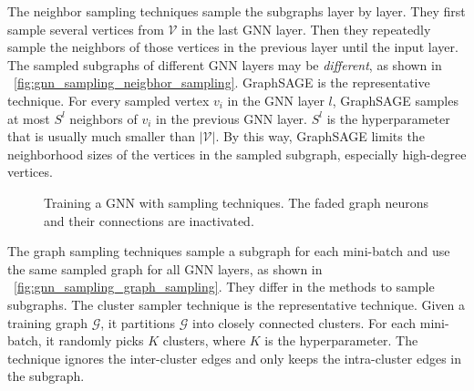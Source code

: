 The neighbor sampling techniques \cite{hamilton2017_graphsage, ying2018_pinsage, chen2018_fastgcn, chen2018_sgcn, huang2018_adap} sample the subgraphs layer by layer.
They first sample several vertices from $\mathcal{V}$ in the last GNN layer.
Then they repeatedly sample the neighbors of those vertices in the previous layer until the input layer.
The sampled subgraphs of different GNN layers may be \emph{different}, as shown in \figurename~\ref{fig:gnn_sampling_neigbhor_sampling}.
GraphSAGE \cite{hamilton2017_graphsage} is the representative technique.
For every sampled vertex $v_i$ in the GNN layer $l$, GraphSAGE samples at most $S^l$ neighbors of $v_i$ in the previous GNN layer.
$S^l$ is the hyperparameter that is usually much smaller than $|\mathcal{V}|$.
By this way, GraphSAGE limits the neighborhood sizes of the vertices in the sampled subgraph, especially high-degree vertices.

\begin{figure}
	\centering
	\caption{Training a GNN with sampling techniques. The faded graph neurons and their connections are inactivated.}
	\label{fig:gnn_sampling}
\end{figure}

The graph sampling techniques \cite{zeng2018_aesg, chiang2019_cluster_gcn, zeng2020_graphsaint} sample a subgraph for each mini-batch and use the same sampled graph for all GNN layers, as shown in \figurename~\ref{fig:gnn_sampling_graph_sampling}.
They differ in the methods to sample subgraphs.
The cluster sampler technique \cite{chiang2019_cluster_gcn} is the representative technique.
Given a training graph $\mathcal{G}$, it partitions $\mathcal{G}$ into closely connected clusters.
For each mini-batch, it randomly picks $K$ clusters, where $K$ is the hyperparameter.
The technique ignores the inter-cluster edges and only keeps the intra-cluster edges in the subgraph.

